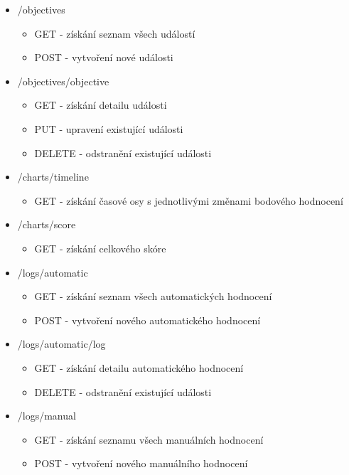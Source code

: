 \documentclass[
  digital, %
  twoside, %
  table,   %
  lof,     %
  lot,     %
]{fithesis3}
\begin{document}
\begin{itemize}
    \item /objectives
    \begin{itemize}
        \item GET - získání seznam všech událostí
        \item POST -  vytvoření nové události
    \end{itemize}
        
    \item /objectives/{objective}
    \begin{itemize}
        \item GET - získání detailu události
        \item PUT - upravení existující události
        \item DELETE - odstranění existující události
    \end{itemize}
        
    \item /charts/timeline
    \begin{itemize}
        \item GET - získání časové osy s jednotlivými změnami bodového hodnocení
    \end{itemize}
        
    \item /charts/score
    \begin{itemize}
        \item GET - získání celkového skóre
    \end{itemize}
        
    \item /logs/automatic
    \begin{itemize}
        \item GET - získání seznam všech automatických hodnocení
        \item POST -  vytvoření nového automatického hodnocení
    \end{itemize}
        
    \item /logs/automatic/{log}
    \begin{itemize}
        \item GET - získání detailu automatického hodnocení
        \item DELETE - odstranění existující události
    \end{itemize}
            
    \item /logs/manual
    \begin{itemize}
        \item GET - získání seznamu všech manuálních hodnocení
        \item POST -  vytvoření nového manuálního hodnocení
    \end{itemize}
            

\end{itemize}
\end{document}
